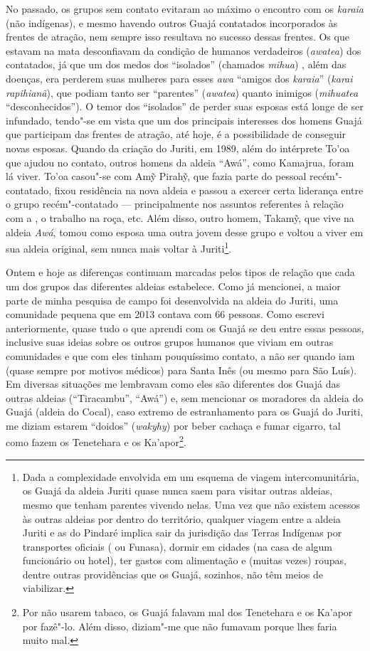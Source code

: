 No passado, os grupos sem contato evitaram ao máximo o encontro com os
\emph{karaia} (não indígenas), e mesmo havendo outros Guajá contatados
incorporados às frentes de atração, nem sempre isso resultava no sucesso
dessas frentes. Os que estavam na mata desconfiavam da condição de
humanos verdadeiros (\emph{awatea}) dos contatados, já que um dos medos
dos ``isolados'' (chamados \emph{mihua}) , além das doenças, era perderem
suas mulheres para esses \emph{awa} ``amigos dos \emph{karaia}''
(\emph{karai rapihianã}), que podiam tanto ser ``parentes''
(\emph{awatea}) quanto inimigos (\emph{mihuatea} ``desconhecidos''). O
temor dos ``isolados'' de perder suas esposas está longe de ser infundado,
tendo"-se em vista que um dos principais interesses dos homens Guajá que
participam das frentes de atração, até hoje, é a possibilidade de
conseguir novas esposas. Quando da criação do  Juriti, em 1989, além
do intérprete To'oa que ajudou no contato, outros homens da aldeia
``Awá'', como Kamajrua, foram lá viver. To'oa casou"-se com Amỹ Pirahỹ, que
fazia parte do pessoal recém"-contatado, fixou residência na nova aldeia
e passou a exercer certa liderança entre o grupo recém"-contatado ---
principalmente nos assuntos referentes à relação com a , o trabalho
na roça, etc. Além disso, outro homem, Takamỹ, que vive na aldeia
\emph{Awá}, tomou como esposa uma outra jovem desse grupo e voltou a
viver em sua aldeia original, sem nunca mais voltar à Juriti\footnote{Dada
  a complexidade envolvida em um esquema de viagem intercomunitária, os
  Guajá da aldeia Juriti quase nunca saem para visitar outras aldeias,
  mesmo que tenham parentes vivendo nelas. Uma vez que não existem
  acessos às outras aldeias por dentro do território, qualquer viagem
  entre a aldeia Juriti e as do Pindaré implica sair da jurisdição das
  Terras Indígenas por transportes oficiais ( ou Funasa), dormir em
  cidades (na casa de algum funcionário ou hotel), ter gastos com
  alimentação e (muitas vezes) roupas, dentre outras providências que os
  Guajá, sozinhos, não têm meios de viabilizar.}.

Ontem e hoje as diferenças continuam marcadas pelos tipos de relação que
cada um dos grupos das diferentes aldeias estabelece. Como já mencionei,
a maior parte de minha pesquisa de campo foi desenvolvida na aldeia do
 Juriti, uma comunidade pequena que em 2013 contava com 66 pessoas.
Como escrevi anteriormente, quase tudo o que aprendi com os Guajá se deu
entre essas pessoas, inclusive suas ideias sobre os outros grupos
humanos que viviam em outras comunidades e que com eles tinham
pouquíssimo contato, a não ser quando iam (quase sempre por motivos
médicos) para Santa Inês (ou mesmo para São Luís). Em diversas situações
me lembravam como eles são diferentes dos Guajá das outras aldeias
(``Tiracambu'', ``Awá'') e, sem mencionar os moradores da aldeia do 
Guajá (aldeia do Cocal), caso extremo de estranhamento para os Guajá do
Juriti, me diziam estarem ``doidos'' (\emph{wakyhy}) por beber cachaça e
fumar cigarro, tal como fazem os Tenetehara e os Ka'apor\footnote{Por
  não usarem tabaco, os Guajá falavam mal dos Tenetehara e os Ka'apor
  por fazê"-lo. Além disso, diziam"-me que não fumavam porque lhes faria
  muito mal.}.

